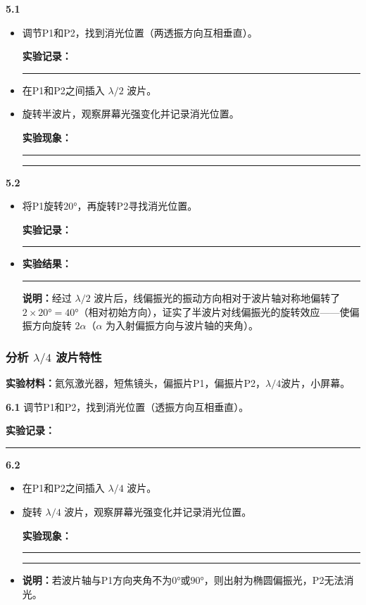 \documentclass[dvipsnames, svgnames,a4paper,11pt]{article}
\newcommand{\recordblank}[1]{%
  \par\noindent\rule{0.95\linewidth}{0pt}\rule{0pt}{#1}\par}
\begin{document}
\textbf{5.1}
\begin{itemize}
    \item 调节P1和P2，找到消光位置（两透振方向互相垂直）。
    
    \textbf{实验记录：}\par
\recordblank{2.8cm}
    \item 在P1和P2之间插入 $\lambda/2$ 波片。
    \item 旋转半波片，观察屏幕光强变化并记录消光位置。
    \par\noindent\textbf{实验现象：}\par
    \recordblank{4cm}
    \recordblank{6cm}
\end{itemize}

\textbf{5.2}
\begin{itemize}
    \item 将P1旋转$20°$，再旋转P2寻找消光位置。
    
    \textbf{实验记录：}\par
\recordblank{2.8cm}
    \item \textbf{实验结果：}\par
\recordblank{2.8cm}
    \textbf{说明：}经过 $\lambda/2$ 波片后，线偏振光的振动方向相对于波片轴对称地偏转了$2\times20°=40°$（相对初始方向），证实了半波片对线偏振光的旋转效应——使偏振方向旋转 $2\alpha$（$\alpha$ 为入射偏振方向与波片轴的夹角）。
\end{itemize}

\subsubsection{分析 $\lambda/4$ 波片特性}
\textbf{实验材料：}氦氖激光器，短焦镜头，偏振片P1，偏振片P2，$\lambda/4$波片，小屏幕。

\textbf{6.1} 调节P1和P2，找到消光位置（透振方向互相垂直）。

\textbf{实验记录：}\par
\recordblank{2.8cm}

\textbf{6.2}
\begin{itemize}
    \item 在P1和P2之间插入 $\lambda/4$ 波片。
    \item 旋转 $\lambda/4$ 波片，观察屏幕光强变化并记录消光位置。
    \par\noindent\textbf{实验现象：}\par
    \recordblank{4cm}
    \recordblank{5cm}
    \item \textbf{说明：}若波片轴与P1方向夹角不为$0°$或$90°$，则出射为椭圆偏振光，P2无法消光。
\end{itemize}
\end{document}
